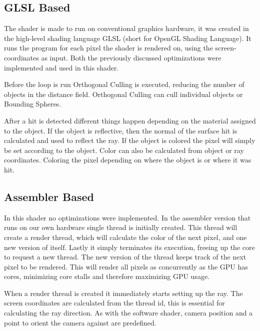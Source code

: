			



		\subsection{GLSL Based}
	
			The shader is made to run on conventional graphics hardware, it was
			created in the high-level shading language GLSL (short for OpenGL
			Shading Language). It runs the program for each pixel the shader is
			rendered on, using the screen-coordinates as input. Both the 
			previously discussed optimizations were implemented and used in this
			shader.
			
			Before the loop is run Orthogonal Culling is executed, reducing the
			number of objects in the distance field. Orthogonal Culling can cull
			individual objects or Bounding Spheres. 
			
			After a hit is detected different things happen depending on the material
			assigned to the object. If the object is reflective, then the normal of the
			surface hit is calculated and used to reflect the ray. If the object is
			colored the pixel will simply be set according to the object. Color can
			also be calculated from object or ray coordinates. Coloring the pixel
			depending on where the object is or where it was hit.

		\subsection{Assembler Based}

			In this shader no optimizations were implemented. In the assembler 
			version that runs on our own hardware single thread is initially 
			created. This thread will create a render thread, which will 
			calculate the color of the next pixel, and one new version of
            itself. Lastly it simply terminates its execution, freeing up the 
            core to request a new thread. The new version of the thread keeps 
            track of the next pixel to be rendered. This will render all pixels 
            as concurrently as the GPU has cores, minimizing core stalls and 
            therefore maximizing GPU usage.

			When a render thread is created it immediately starts setting up the
			ray. The screen coordinates are calculated from the thread id, this 
			is essential for calculating the ray direction. As with the software
			shader, camera position and a point	to orient the camera against are 
			predefined. 

